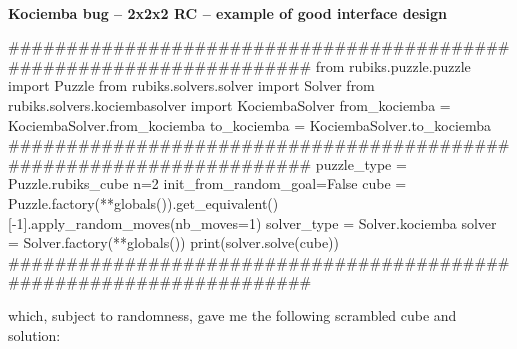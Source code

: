 \afblue
\paragraph{}{\textbf{Kociemba bug -- 2x2x2 \textbf{RC} -- example of good interface design}}
\begin{python}
#####################################################################
from rubiks.puzzle.puzzle import Puzzle
from rubiks.solvers.solver import Solver
from rubiks.solvers.kociembasolver import KociembaSolver
from_kociemba = KociembaSolver.from_kociemba
to_kociemba = KociembaSolver.to_kociemba
#####################################################################
puzzle_type = Puzzle.rubiks_cube
n=2
init_from_random_goal=False
cube = Puzzle.factory(**globals()).get_equivalent()[-1].apply_random_moves(nb_moves=1)
solver_type = Solver.kociemba
solver = Solver.factory(**globals())
print(solver.solve(cube))
#####################################################################
\end{python}
\black

which, subject to randomness, gave me the following scrambled cube and solution:

